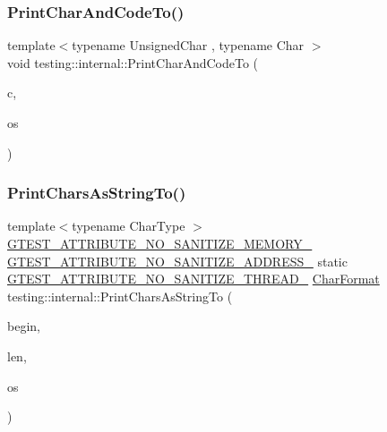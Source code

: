 \mbox{\label{namespacetesting_1_1internal_a0c577e598e61d339ba45dd6643fb1969}} 
\subsubsection{\texorpdfstring{PrintCharAndCodeTo()}{PrintCharAndCodeTo()}}
{\footnotesize\ttfamily template$<$typename Unsigned\+Char , typename Char $>$ \\
void testing\+::internal\+::\+Print\+Char\+And\+Code\+To (\begin{DoxyParamCaption}\item[{Char}]{c,  }\item[{ostream $\ast$}]{os }\end{DoxyParamCaption})}

\mbox{\label{namespacetesting_1_1internal_aa74d42b9fdd837ae0af3044acc77aac9}} 
\subsubsection{\texorpdfstring{PrintCharsAsStringTo()}{PrintCharsAsStringTo()}}
{\footnotesize\ttfamily template$<$typename Char\+Type $>$ \\
\mbox{\hyperlink{gtest-port_8h_a2a83dd79037e53814a509cc3f5702650}{G\+T\+E\+S\+T\+\_\+\+A\+T\+T\+R\+I\+B\+U\+T\+E\+\_\+\+N\+O\+\_\+\+S\+A\+N\+I\+T\+I\+Z\+E\+\_\+\+M\+E\+M\+O\+R\+Y\+\_\+}} \mbox{\hyperlink{gtest-port_8h_af18b465f4ba6e36eea7a8d2d79521873}{G\+T\+E\+S\+T\+\_\+\+A\+T\+T\+R\+I\+B\+U\+T\+E\+\_\+\+N\+O\+\_\+\+S\+A\+N\+I\+T\+I\+Z\+E\+\_\+\+A\+D\+D\+R\+E\+S\+S\+\_\+}} static \mbox{\hyperlink{gtest-port_8h_abf30a6b1b3a12ecb2cc1bc1a6f5f9646}{G\+T\+E\+S\+T\+\_\+\+A\+T\+T\+R\+I\+B\+U\+T\+E\+\_\+\+N\+O\+\_\+\+S\+A\+N\+I\+T\+I\+Z\+E\+\_\+\+T\+H\+R\+E\+A\+D\+\_\+}} \mbox{\hyperlink{namespacetesting_1_1internal_ae2ef98247c76a50cdc80ceb4a6c81793}{Char\+Format}} testing\+::internal\+::\+Print\+Chars\+As\+String\+To (\begin{DoxyParamCaption}\item[{const Char\+Type $\ast$}]{begin,  }\item[{size\+\_\+t}]{len,  }\item[{ostream $\ast$}]{os }\end{DoxyParamCaption})\hspace{0.3cm}{\ttfamily [static]}}

